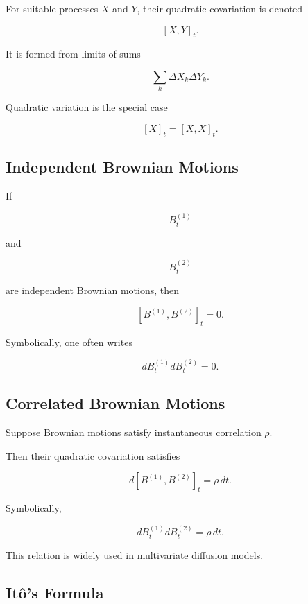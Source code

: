 For suitable processes \(X\) and \(Y\), their quadratic covariation is
denoted

\[
\boxed{
[X,Y]_t.
}
\]

It is formed from limits of sums

\[
\sum_k
\Delta X_k
\Delta Y_k.
\]

Quadratic variation is the special case

\[
\boxed{
[X]_t
=
[X,X]_t.
}
\]

\subsection{Independent Brownian Motions}
\label{subsec:independent-brownian-covariation}

If

\[
B_t^{(1)}
\]

and

\[
B_t^{(2)}
\]

are independent Brownian motions, then

\[
\boxed{
[B^{(1)},B^{(2)}]_t
=
0.
}
\]

Symbolically, one often writes

\[
\boxed{
dB_t^{(1)}
dB_t^{(2)}
=
0.
}
\]

\subsection{Correlated Brownian Motions}
\label{subsec:correlated-brownian-motions}

Suppose Brownian motions satisfy instantaneous correlation \(\rho\).

Then their quadratic covariation satisfies

\[
\boxed{
d[B^{(1)},B^{(2)}]_t
=
\rho\,dt.
}
\]

Symbolically,

\[
\boxed{
dB_t^{(1)}
dB_t^{(2)}
=
\rho\,dt.
}
\]

This relation is widely used in multivariate diffusion models.

\subsection{It\^o's Formula}
\label{subsec:ito-formula}

